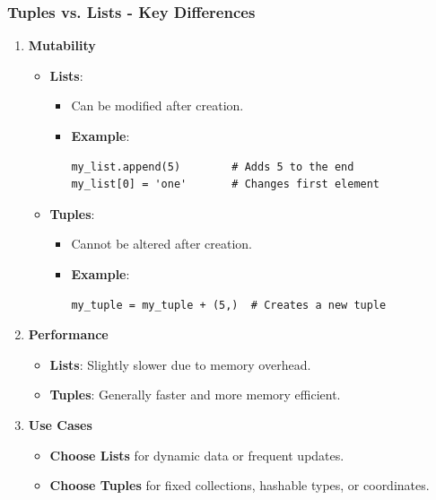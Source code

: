 \documentclass{beamer}
\begin{document}
\begin{frame}[fragile]
    \frametitle{Tuples vs. Lists - Key Differences}
    \begin{enumerate}
        \item \textbf{Mutability}
        \begin{itemize}
            \item \textbf{Lists}:
            \begin{itemize}
                \item Can be modified after creation.
                \item \textbf{Example}:
                \begin{lstlisting}
my_list.append(5)        # Adds 5 to the end
my_list[0] = 'one'       # Changes first element
                \end{lstlisting}
            \end{itemize}
            \item \textbf{Tuples}: 
            \begin{itemize}
                \item Cannot be altered after creation.
                \item \textbf{Example}:
                \begin{lstlisting}
my_tuple = my_tuple + (5,)  # Creates a new tuple
                \end{lstlisting}
            \end{itemize}
        \end{itemize}
        
        \item \textbf{Performance}
        \begin{itemize}
            \item \textbf{Lists}: Slightly slower due to memory overhead.
            \item \textbf{Tuples}: Generally faster and more memory efficient.
        \end{itemize}
        
        \item \textbf{Use Cases}
        \begin{itemize}
            \item \textbf{Choose Lists} for dynamic data or frequent updates.
            \item \textbf{Choose Tuples} for fixed collections, hashable types, or coordinates.
        \end{itemize}
    \end{enumerate}
\end{frame}
\end{document}
